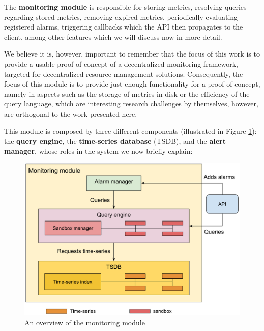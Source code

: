 

The \textbf{monitoring module} is responsible for storing metrics, resolving queries regarding stored metrics, removing expired metrics, periodically evaluating registered alarms, triggering callbacks which the API then propagates to the client, among other features which we will discuss now in more detail.

We believe it is, however, important to remember that the focus of this work is to provide a usable proof-of-concept of a decentralized monitoring framework, targeted for decentralized resource management solutions. Consequently, the focus of this module is to provide just enough functionality for a proof of concept, namely in aspects such as the storage of metrics in disk or the efficiency of the query language, which are interesting research challenges by themselves, however, are orthogonal to the work presented here. 

This module is composed by three different components (illustrated in Figure \ref{fig:mon_module_overview}): the \textbf{query engine}, the \textbf{time-series database} (TSDB), and the \textbf{alert manager}, whose roles in the system we now briefly explain:

\begin{figure}[htbp]
    \centering
    \includegraphics[width=\textwidth]{Chapters/mon_module/images/Monitoring_module.pdf}
    \caption{An overview of the monitoring module}
    \label{fig:mon_module_overview}
\end{figure}

